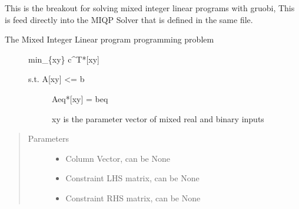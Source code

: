 \documentclass[letterpaper,10pt,english]{sphinxmanual}
\begin{document}
\begin{fulllineitems}
\label{\detokenize{mpo.solver_interface:mpo.solver_interface.gurobi_solver_interface.solve_lp_gurobi}}
\sphinxAtStartPar
This is the breakout for solving mixed integer linear programs with gruobi, This is feed directly into the
MIQP Solver that is defined in the same file.
\begin{description}
\item[{The Mixed Integer Linear program programming problem}] \leavevmode
\sphinxAtStartPar
min\_\{xy\} c\textasciicircum{}T*{[}xy{]}
\begin{description}
\item[{s.t.    A{[}xy{]} \textless{}= b}] \leavevmode
\sphinxAtStartPar
Aeq*{[}xy{]} = beq

\sphinxAtStartPar
xy is the parameter vector of mixed real and binary inputs

\end{description}

\end{description}
\begin{quote}\begin{description}
\item[{Parameters}] \leavevmode\begin{itemize}
\item {} 
\sphinxAtStartPar
{} \textendash{} Column Vector, can be None

\item {} 
\sphinxAtStartPar
{} \textendash{} Constraint LHS matrix, can be None

\item {} 
\sphinxAtStartPar
{} \textendash{} Constraint RHS matrix, can be None


\end{itemize}
\end{description}
\end{quote}
\end{fulllineitems}
\end{document}
